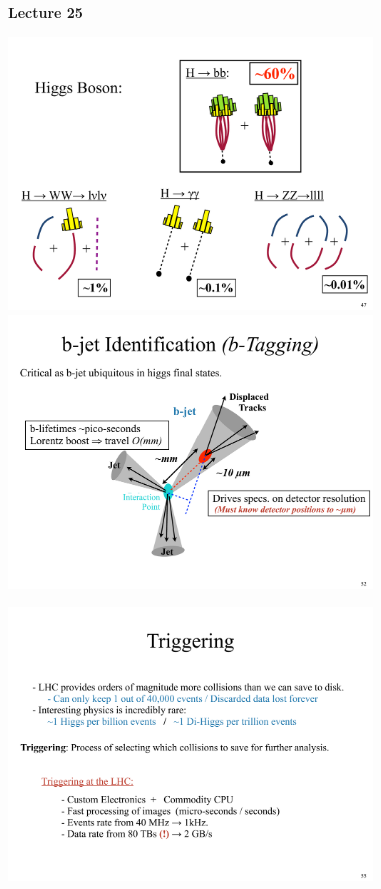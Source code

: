 
\usepackage{braket}
\usepackage{bbm}
\usepackage{relsize}
\usepackage{tcolorbox}




\usepackage{fancyhdr}

\fancyhf{}


\thispagestyle{fancy}

\begin{center}
{\huge \textbf{Lecture 25}}
\end{center}

{\fontsize{14}{16}\selectfont

\bc
\includegraphics[width=0.725\textwidth]{./HiggsBosonDecays.pdf}
\ec
\lineacross
\bc
\includegraphics[width=0.725\textwidth]{./BTagging.pdf}
\ec

\clearpage

\bc
\includegraphics[width=0.725\textwidth]{./Triggering.pdf}
\ec
\lineacross

}
